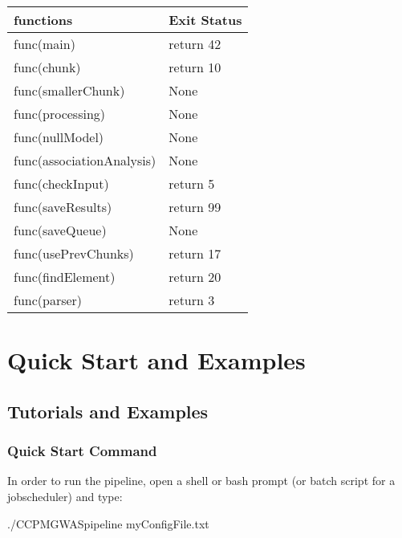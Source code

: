 \documentclass[letterpaper,10pt,english]{sphinxmanual}
\begin{document}
\begin{savenotes}\sphinxattablestart
\centering
\begin{tabulary}{\linewidth}[t]{|T|T|}
\hline
\sphinxstyletheadfamily 
functions
&\sphinxstyletheadfamily 
Exit Status
\\
\hline
func(main)
&
return 42
\\
\hline
func(chunk)
&
return 10
\\
\hline
func(smallerChunk)
&
None
\\
\hline
func(processing)
&
None
\\
\hline
func(nullModel)
&
None
\\
\hline
func(associationAnalysis)
&
None
\\
\hline
func(checkInput)
&
return 5
\\
\hline
func(saveResults)
&
return 99
\\
\hline
func(saveQueue)
&
None
\\
\hline
func(usePrevChunks)
&
return 17
\\
\hline
func(findElement)
&
return 20
\\
\hline
func(parser)
&
return 3
\\
\hline
\end{tabulary}
\par
\sphinxattableend\end{savenotes}


\chapter{Quick Start and Examples}
\label{\detokenize{index:quick-start-and-examples}}

\section{Tutorials and Examples}
\label{\detokenize{exampleWorkFlows:tutorials-and-examples}}\label{\detokenize{exampleWorkFlows::doc}}

\subsection{Quick Start Command}
\label{\detokenize{exampleWorkFlows:quick-start-command}}
In order to run the pipeline, open a shell or bash prompt (or batch script for a job\sphinxhyphen{}scheduler) and type:

\begin{sphinxVerbatim}[commandchars=\\\{\}]
\PYGZdl{} ./CCPM\PYGZus{}GWAS\PYGZus{}pipeline myConfigFile.txt
\end{sphinxVerbatim}
\end{document}
